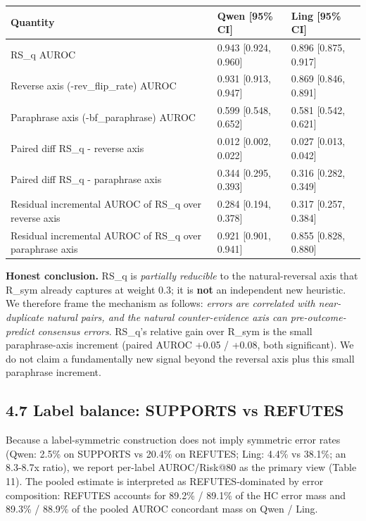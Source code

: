 \documentclass[11pt]{article}
\begin{document}
\begin{table}[t]
\centering
\small
\begin{tabular}{lll}
\toprule
Quantity & Qwen [95\% CI] & Ling [95\% CI] \\
\midrule
RS\_q AUROC & 0.943 [0.924, 0.960] & 0.896 [0.875, 0.917] \\
Reverse axis (-rev\_flip\_rate) AUROC & 0.931 [0.913, 0.947] & 0.869 [0.846, 0.891] \\
Paraphrase axis (-bf\_paraphrase) AUROC & 0.599 [0.548, 0.652] & 0.581 [0.542, 0.621] \\
Paired diff RS\_q - reverse axis & 0.012 [0.002, 0.022] & 0.027 [0.013, 0.042] \\
Paired diff RS\_q - paraphrase axis & 0.344 [0.295, 0.393] & 0.316 [0.282, 0.349] \\
Residual incremental AUROC of RS\_q over reverse axis & 0.284 [0.194, 0.378] & 0.317 [0.257, 0.384] \\
Residual incremental AUROC of RS\_q over paraphrase axis & 0.921 [0.901, 0.941] & 0.855 [0.828, 0.880] \\
\bottomrule
\end{tabular}
\end{table}


\textbf{Honest conclusion.} RS\_q is \emph{partially reducible} to the natural-reversal axis that R\_sym already captures at weight 0.3; it is \textbf{not} an independent new heuristic. We therefore frame the mechanism as follows: \emph{errors are correlated with near-duplicate natural pairs, and the natural counter-evidence axis can pre-outcome-predict consensus errors}. RS\_q's relative gain over R\_sym is the small paraphrase-axis increment (paired AUROC +0.05 / +0.08, both significant). We do not claim a fundamentally new signal beyond the reversal axis plus this small paraphrase increment.

\subsection{4.7 Label balance: SUPPORTS vs REFUTES}

Because a label-symmetric construction does not imply symmetric error rates (Qwen: 2.5\% on SUPPORTS vs 20.4\% on REFUTES; Ling: 4.4\% vs 38.1\%; an 8.3-8.7x ratio), we report per-label AUROC/Risk@80 as the primary view (Table 11). The pooled estimate is interpreted as REFUTES-dominated by error composition: REFUTES accounts for 89.2\% / 89.1\% of the HC error mass and 89.3\% / 88.9\% of the pooled AUROC concordant mass on Qwen / Ling.
\end{document}
